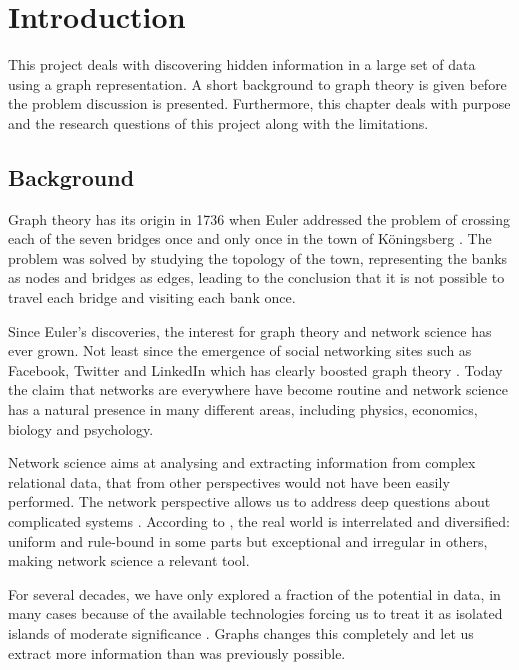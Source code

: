 \chapter{Introduction}
This project deals with discovering hidden information in a large set of data using a graph representation. A short background to graph theory is given before the problem discussion is presented. Furthermore, this chapter deals with purpose and the research questions of this project along with the limitations. 

\section{Background}
Graph theory has its origin in 1736 when Euler addressed the problem of crossing each of the seven bridges once and only once in the town of Köningsberg \cite{fouss2016algorithms}. The problem was solved by studying the topology of the town, representing the banks as nodes and bridges as edges, leading to the conclusion that it is not possible to travel each bridge and visiting each bank once.

Since Euler's discoveries, the interest for graph theory and network science has ever grown. Not least since the emergence of social networking sites such as Facebook, Twitter and LinkedIn which has clearly boosted graph theory \cite{fouss2016algorithms,barabasi2016network}. Today the claim that networks are everywhere have become routine \cite{brandes2013} and network science has a natural presence in many different areas, including physics, economics, biology and psychology.

Network science aims at analysing and extracting information from complex relational data, that from other perspectives would not have been easily performed. The network perspective allows us to address deep questions about complicated systems \cite{brandes2013}. According to \citet{robinson2013}, the real world is interrelated and diversified: uniform and rule-bound in some parts but exceptional and irregular in others, making network science a relevant tool.

For several decades, we have only explored a fraction of the potential in data, in many cases because of the available technologies forcing us to treat it as isolated islands of moderate significance \cite{robinson2013}. Graphs changes this completely and let us extract more information than was previously possible.

